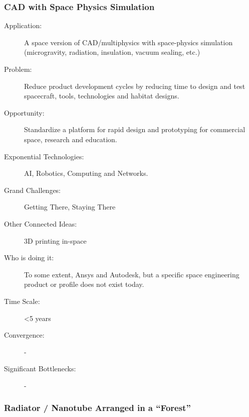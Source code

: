    \subsubsection{CAD with Space Physics Simulation} 
 \begin{description}  \item[Application:] A space version of \gls{CAD}/multiphysics with space-physics simulation  (microgravity, radiation, insulation, vacuum sealing, etc.)
 
   \item[Problem:] Reduce product development cycles by reducing time to  design and test spacecraft, tools, technologies and habitat designs.
 
   \item[Opportunity:] Standardize a platform for rapid design and  prototyping for commercial space, research and education.
 
   \item[Exponential Technologies:] AI, Robotics, Computing and Networks.
 
   \item[Grand Challenges:] Getting There, Staying There
 
   \item[Other Connected Ideas:] 3D printing in-space
 
 
   \item[Who is doing it:] To  some extent, Ansys and Autodesk, but a specific space engineering  product or profile does not exist today.
 
   \item[Time Scale:] <5 years
 
   \item[Convergence:] -
 
   \item[Significant Bottlenecks:] -
      \end{description}
  
\subsubsection{Radiator  / Nanotube Arranged in a ``Forest''}

